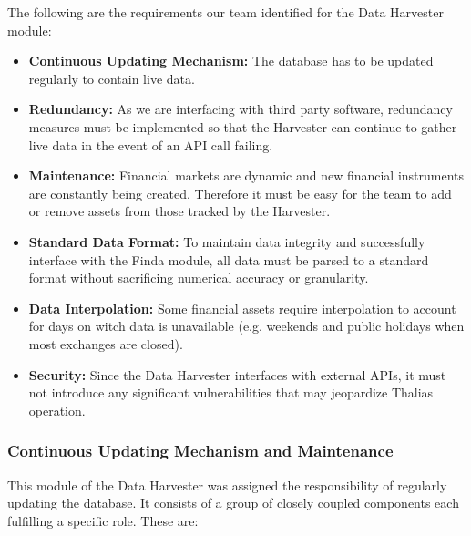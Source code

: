 \documentclass[main.tex]{subfiles}
\begin{document}
The following are the requirements our team identified for the Data Harvester module:

\begin{itemize}
    \item \textbf{Continuous Updating Mechanism:} The database has to be updated regularly to contain live data.
    \item \textbf{Redundancy:} As we are interfacing with third party software, redundancy measures must be implemented so that the Harvester can continue to gather live data in the event of an API call failing.
    \item \textbf{Maintenance:} Financial markets are dynamic and new financial instruments are constantly being created. Therefore it must be easy for the team to add or remove assets from those tracked by the Harvester.
    \item \textbf{Standard Data Format:} To maintain data integrity and successfully interface with the Finda module, all data must be parsed to a standard format without sacrificing numerical accuracy or granularity.
    \item \textbf{Data Interpolation:} Some financial assets require interpolation to account for days on witch data is unavailable (e.g. weekends and public holidays when most exchanges are closed).
    \item \textbf{Security:} Since the Data Harvester interfaces with external APIs, it must not introduce any significant vulnerabilities that may jeopardize Thalias operation.
\end{itemize}

\subsubsection{Continuous Updating Mechanism and Maintenance}
This module of the Data Harvester was assigned the responsibility of regularly updating the database. It consists of a group of closely coupled components each fulfilling a specific role. These are:
\end{document}
